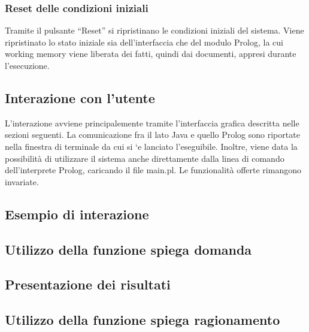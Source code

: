     \subsubsection{Reset delle condizioni iniziali}
    Tramite il pulsante “Reset” si ripristinano le condizioni iniziali del sistema.
    Viene ripristinato lo stato iniziale sia dell’interfaccia che del modulo Prolog, la cui working memory viene liberata dei fatti, quindi dai    documenti, appresi durante l’esecuzione.

\subsection{Interazione con l’utente}
L’interazione avviene principalemente tramite l’interfaccia grafica descritta nelle sezioni seguenti. La comunicazione fra il lato Java e quello Prolog sono riportate nella finestra di terminale da cui si `e lanciato l’eseguibile. Inoltre, viene data la possibilità di utilizzare il sistema anche direttamente dalla linea di comando dell’interprete Prolog, caricando il file main.pl. Le funzionalità offerte rimangono invariate. 

\subsection{Esempio di interazione}

\subsection{Utilizzo della funzione spiega domanda}

\subsection{Presentazione dei risultati}

\subsection{Utilizzo della funzione spiega ragionamento}
